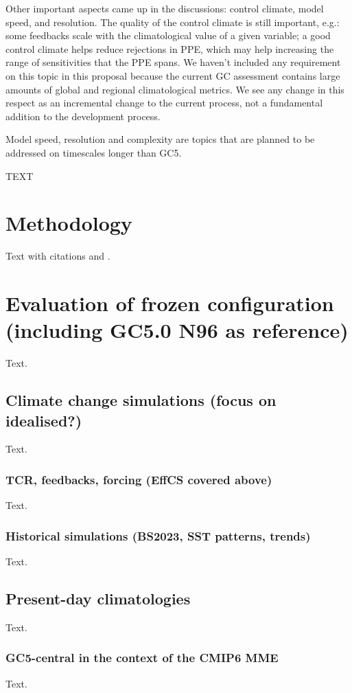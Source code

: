 \documentclass[gmd, manuscript]{copernicus}
\begin{document}
Other important aspects came up in the discussions: control climate, model speed, and resolution.
The quality of the control climate is still important, e.g.: some feedbacks scale with the climatological value of a given variable; a good control climate helps reduce rejections in PPE, which may help increasing the range of sensitivities that the PPE spans.
We haven’t included any requirement on this topic in this proposal because the current GC assessment contains large amounts of global and regional climatological metrics. We see any change in this respect as an incremental change to the current process, not a fundamental addition to the development process.

Model speed, resolution and complexity are topics that are planned to be addressed on timescales longer than GC5.


TEXT \citep{xavier25gc5}

\section{Methodology}\label{sec:methodology}
Text with citations \cite{bodassalcedo18} and \cite{bodassalcedo23}.


\section{Evaluation of frozen configuration (including GC5.0 N96 as reference)}\label{sec:evaluation}
Text.

\subsection{Climate change simulations (focus on idealised?)}
Text.

\subsubsection{TCR, feedbacks, forcing (EffCS covered above)}
Text.

\subsubsection{Historical simulations (BS2023, SST patterns, trends)}
Text.

\subsection{Present-day climatologies}
Text.
\subsubsection{GC5-central in the context of the CMIP6 MME}
Text.
\end{document}

